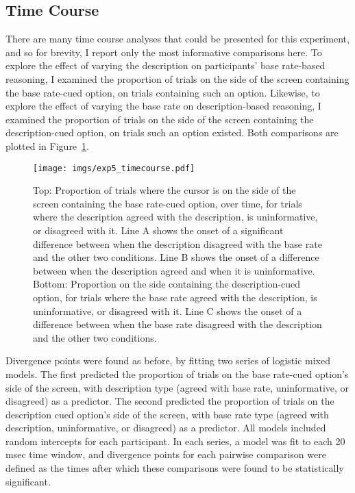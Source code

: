 \subsection{Time Course}

There are many time course analyses that
could be presented for this experiment,
and so for brevity, I report only the most informative comparisons here.
To explore the effect of varying the description
on participants' base rate-based reasoning,
I examined the proportion of trials on the side of the screen
containing the base rate-cued option,
on trials containing such an option.
Likewise, to explore the effect of varying the base rate
on description-based reasoning,
I examined the proportion of trials on the side of the screen
containing the description-cued option,
on trials such an option existed.
Both comparisons are plotted in Figure~\ref{fig:exp5_timecourse}.


\begin{figure}[ht]
  \centering
  \texttt{[image: imgs/exp5\_timecourse.pdf]}
  \caption[Time course plots for the effect of descriptions
    on base rate-cued choices, and vice versa, in Experiment 5.]{
    \label{fig:exp5_timecourse}
    Top: Proportion of trials where the cursor is
    on the side of the screen containing the base rate-cued option, over time,
    for trials where the description agreed with the description,
    is uninformative, or disagreed with it.
    Line A shows the onset of a significant difference between
    when the description disagreed with the base rate and the other two conditions.
    Line B shows the onset of a difference between when the description agreed
    and when it is uninformative.
    \\
    Bottom: Proportion on the side containing the description-cued option,
    for trials where the base rate agreed with the description,
    is uninformative, or disagreed with it.
    Line C shows the onset of a difference between
    when the base rate disagreed with the description and the other two conditions.
  }
\end{figure}

Divergence points were found as before,
by fitting two series of logistic mixed models.
The first predicted the proportion of trials on
the base rate-cued option's side of the screen,
with description type
(agreed with base rate, uninformative, or disagreed) as a predictor.
The second predicted the proportion of trials on
the description cued option's side of the screen,
with base rate type
(agreed with description, uninformative, or disagreed) as a predictor.
All models included random intercepts for each participant.
In each series, a model was fit to each 20 msec time window,
and divergence points for each pairwise comparison were defined as
the times after which these comparisons were found to be
statistically significant.
 

